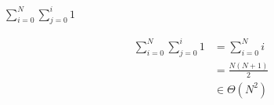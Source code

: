 \question $\displaystyle\sum_{i = 0}^{N} \sum_{j = 0}^{i} 1$
\begin{solution}[1in]
\begin{align*}
\sum_{i = 0}^{N} \sum_{j = 0}^{i} 1
&= \sum_{i = 0}^{N} i \\
&= \frac{N(N + 1)}{2} \\
&\in \Theta(N^2)
\end{align*}
\end{solution}